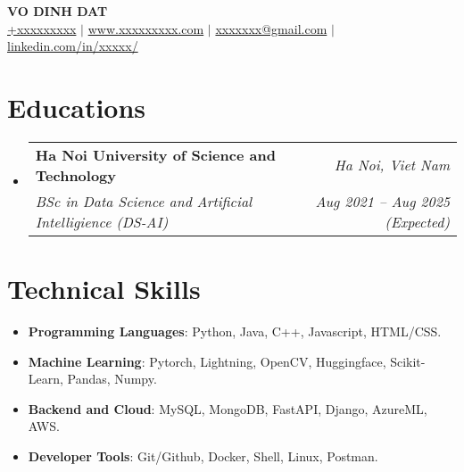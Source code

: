 \documentclass[letterpaper,11pt]{article}
\makeatletter
\newcommand{\resumeitem}[1]{
  \item\small{
    #1 \vspace{-2pt}
  }
}
\newcommand{\resumeSubheading}[4]{
  \vspace{-1pt}\item
    \begin{tabular*}{0.97\textwidth}[t]{l@{\extracolsep{\fill}}r}
      \textbf{#1} & \textit{#2} \\
      \textit{\small#3} & \textit{\small #4} \\
    \end{tabular*}\vspace{-6pt}
}
\newcommand{\resumeSubHeadingListStart}{\begin{itemize}[leftmargin=*,label={}]}
\newcommand{\resumeSubHeadingListEnd}{\end{itemize}}
\newcommand{\resumeItemListStart}{\begin{itemize}}
\newcommand{\resumeItemListEnd}{\end{itemize}\vspace{-5pt}}
\makeatother
\begin{document}

\begin{center}
  \textbf{\LARGE {VO DINH DAT}} \\ \vspace{1pt}
  \href{tel:+xxxxxxxxx}{{+xxxxxxxxx}} $|$ \href{https://xxxxxx.com}{{www.xxxxxxxxx.com}}
  $|$ \href{mailto:xxxxxxxx@gmail.com}{{xxxxxxx@gmail.com}} $|$ 
  \href{https://www.linkedin.com/in/xxxxxxx/}{{linkedin.com/in/xxxxx/}}
  
\end{center}

\section{Educations}
  \resumeSubHeadingListStart
    \resumeSubheading
      {Ha Noi University of Science and Technology}{\textit{Ha Noi, Viet Nam}}
      {BSc in Data Science and Artificial Intelligience (DS-AI)}{Aug 2021 -- Aug 2025 (Expected)}
  \resumeSubHeadingListEnd

  
\section{Technical Skills}
\resumeItemListStart[leftmargin=*,label={}]
  \resumeitem{\textbf{Programming Languages}: {Python, Java, C++, Javascript, HTML/CSS.}} \\[-\baselineskip]
  \resumeitem{\textbf{Machine Learning}: {Pytorch, Lightning, OpenCV, Huggingface, Scikit-Learn, Pandas, Numpy.}} \\[-\baselineskip]
  \resumeitem{\textbf{Backend and Cloud}: {MySQL, MongoDB, FastAPI, Django, AzureML, AWS.}} \\[-\baselineskip]
  \resumeitem{\textbf{Developer Tools}: {Git/Github, Docker, Shell, Linux, Postman.}}\\[-\baselineskip]
\resumeItemListEnd
\end{document}
